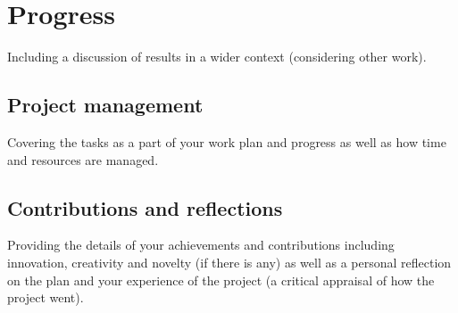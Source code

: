 \chapter{Progress}


Including a discussion of results in a wider context (considering other work).


\section{Project management}

Covering the tasks as a part of your work plan and progress as well as how time and resources are managed.


\section{Contributions and reflections}

Providing the details of your achievements and contributions including innovation, creativity and novelty (if there is any) as well as a personal reflection on the plan and your experience of the project (a critical appraisal of how the project went).

